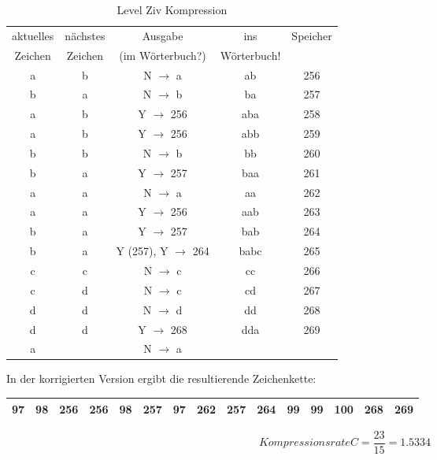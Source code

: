 \documentclass[12pt,german]{article}
\begin{document}
\begin{table}[H]
  \centering
  \begin{tabular}{| c | c | c | c | c |}
    \hline
   	aktuelles  & nächstes  & Ausgabe  & ins & Speicher \\
   	 Zeichen &  Zeichen &  (im Wörterbuch?) & Wörterbuch! &  \\
	a & b & N $ \rightarrow $ a & ab & 256 \\
	b & a & N $ \rightarrow $ b & ba & 257 \\
	a & b & Y $ \rightarrow $ 256 & aba & 258 \\
	a & b & Y $ \rightarrow $ 256 & abb & 259 \\
	b & b & N $ \rightarrow $ b & bb & 260 \\
	b & a & Y $ \rightarrow $ 257 & baa & 261 \\
	a & a & N $ \rightarrow $ a & aa & 262 \\
	a & a & Y $ \rightarrow $ 256 & aab & 263 \\
	b & a & Y $ \rightarrow $ 257 & bab & 264 \\
	b & a & Y (257), Y $ \rightarrow $ 264 & babc & 265 \\
	c & c & N $ \rightarrow $ c & cc & 266 \\
	c & d & N $ \rightarrow $ c & cd & 267 \\
	d & d & N $ \rightarrow $ d & dd & 268 \\
	d & d & Y $ \rightarrow $ 268 & dda & 269 \\
	a &   & N $ \rightarrow $ a &     &   \\ 
   	
  \end{tabular}
  \caption{Level Ziv Kompression}
  \label{tab:Level Ziv Kompression}
\end{table}

In der korrigierten Version ergibt die resultierende Zeichenkette: 

\begin{table}[H]
  \centering
  \begin{tabular}{| c | c | c | c | c | c | c | c | c | c | c | c | c | c | c |}
    \hline
    97 & 98& 256 & 256 & 98 & 257 & 97 & 262 & 257 & 264 & 99 & 99 & 100 & 268 & 269 \\
    \hline
  \end{tabular}
\end{table}


\begin{equation}[H]
 Kompressionsrate C = \frac{23}{15} = 1.5334	
\end{equation}
\end{document}

